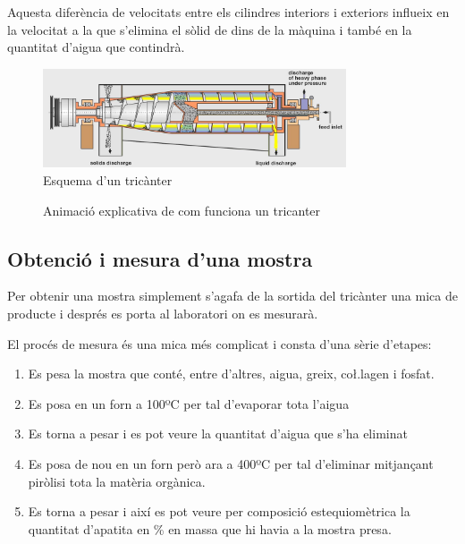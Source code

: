 \documentclass[a4paper]{article}
\begin{document}
Aquesta diferència de velocitats entre els cilindres interiors i exteriors influeix en la velocitat a la que s'elimina el sòlid de dins de la màquina i també en la quantitat d'aigua que contindrà.

\begin{figure}[H]
	\centering
	\includegraphics[width=0.8\textwidth]{images/tricanter}
	\caption{Esquema d'un tricànter}
	\label{fig:tricanter}
\end{figure}

\begin{figure}[H] 
	\centering 
	\caption{Animació explicativa de com funciona un tricanter} 
\end{figure} 

\subsection{Obtenció i mesura d'una mostra}
Per obtenir una mostra simplement s'agafa de la sortida del tricànter una mica de producte i després es porta al laboratori on es mesurarà.

El procés de mesura és una mica més complicat i consta d'una sèrie d'etapes:

\begin{enumerate}
	\item Es pesa la mostra que conté, entre d'altres, aigua, greix, co\l.lagen i fosfat.
	\item Es posa en un forn a 100ºC per tal d'evaporar tota l'aigua 
	\item Es torna a pesar i es pot veure la quantitat d'aigua que s'ha eliminat
	\item Es posa de nou en un forn però ara a 400ºC per tal d'eliminar mitjançant piròlisi tota la matèria orgànica.
	\item Es torna a pesar i així es pot veure per composició estequiomètrica la quantitat d'apatita en \% en massa que hi havia a la mostra presa.
\end{enumerate} 
\end{document}
